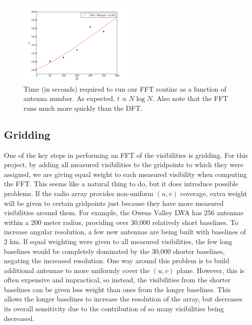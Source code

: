 \documentclass[11pt,letterpaper]{article}
\begin{document}
\begin{figure}[!h]
\centering
\includegraphics[width=0.5\textwidth]{FFT_image_timing.pdf}
\caption{Time (in seconds) required to run our FFT routine as a function of 
antenna number.  As expected, $t\propto N\log N$.  Also note that the FFT 
runs much more quickly than the DFT.}
\label{fig:FFTtime}
\end{figure}

\subsection{Gridding}
One of the key steps in performing an FFT of the visibilities is gridding.  
For this project, by adding all measured visibilities to the gridpoints 
to which they were assigned, we are giving equal weight to each 
measured visibility when computing the FFT.  This seems like a natural 
thing to do, but it does introduce possible problems.  If the radio array 
provides non-uniform $(u,v)$ coverage, extra weight will be given to 
certain gridpoints just because they have more measured 
visibilities around them.  For example, the Owens Valley LWA 
has 256 antennae within a 200 meter radius, providing over 
30,000 relatively short baselines.  To increase angular 
resolution, a few new antennae are being built with baselines 
of 2 km.  If equal weighting were given to all measured visibilities, 
the few long baselines would be completely dominated by the 30,000 
shorter baselines, negating the increased resolution.  One way around 
this problem is to build additional antennae to more uniformly cover the 
$(u,v)$ plane.  However, this is often expensive and impractical, so instead, 
the visibilities from the shorter baselines can be given less weight than 
ones from the longer baselines.  This allows the longer baselines to 
increase the resolution of the array, but decreases its overall 
sensitivity due to the contribution of so many visibilities being decreased.
\end{document}
